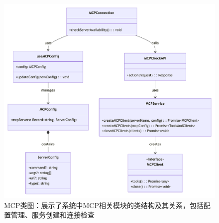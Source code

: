 \begin{figure}[htbp]
  \centering
  \includegraphics[width=\textwidth]{figures/mcp_class.pdf}
  \caption{MCP类图：展示了系统中MCP相关模块的类结构及其关系，包括配置管理、服务创建和连接检查}
  \label{fig:mcp_class}
\end{figure}










